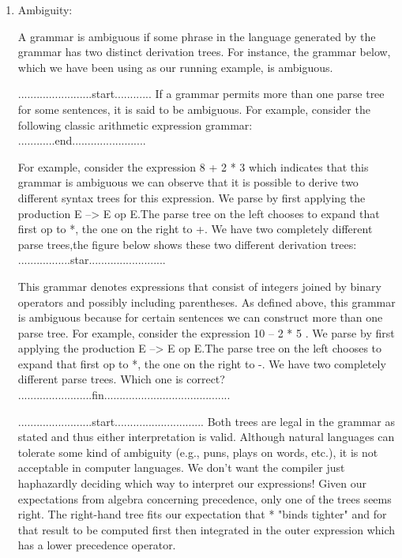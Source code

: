 \begin{enumerate}
\item Ambiguity:

A grammar is ambiguous if some phrase in the language generated by the grammar has two distinct derivation trees. For instance, the grammar below, which we have been using as our running example, is ambiguous.

........................start............
If a grammar permits more than one parse tree for some sentences, it is said to be ambiguous. For example, consider the following classic arithmetic expression grammar:\\
............end........................



For example, consider the expression 8 + 2 * 3 which indicates that this grammar is ambiguous we can observe that it is possible to derive two different syntax trees for this expression.
We parse by first applying the production E –> E op E.The parse tree on the left chooses to expand that first op to *, the one on the right to +. We have two completely different parse trees,the figure below shows these two different derivation trees:\\






.................star.........................

This grammar denotes expressions that consist of integers joined by binary operators and possibly including parentheses. As defined above, this grammar is ambiguous because for certain sentences we can construct more than one parse tree. For example, consider the expression 10 – 2 * 5 . We parse by first applying the production E –> E op E.The parse tree on the left chooses to expand that first op to *, the one on the right to -. We have two completely different parse trees. Which one is correct?\\

........................fin.........................................


........................start.............................
Both trees are legal in the grammar as stated and thus either interpretation is valid. Although natural languages can tolerate some kind of ambiguity (e.g., puns, plays on
words, etc.), it is not acceptable in computer languages. We don’t want the compiler just haphazardly deciding which way to interpret our expressions! Given our expectations from algebra concerning precedence, only one of the trees seems right. The right-hand
tree fits our expectation that * "binds tighter" and for that result to be computed first then integrated in the outer expression which has a lower precedence operator.\\


\end{enumerate}
